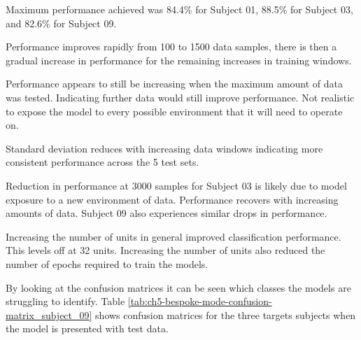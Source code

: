 Maximum performance achieved was 84.4\% for Subject 01, 88.5\% for Subject 03, and 82.6\% for Subject 09.

Performance improves rapidly from 100 to 1500 data samples, there is then a gradual increase in performance for the remaining increases in training windows.

Performance appears to still be increasing when the maximum amount of data was tested. Indicating further data would still improve performance. Not realistic to expose the model to every possible environment that it will need to operate on.

Standard deviation reduces with increasing data windows indicating more consistent performance across the 5 test sets.

Reduction in performance at 3000 samples for Subject 03 is likely due to model exposure to a new environment of data. Performance recovers with increasing amounts of data. Subject 09 also experiences similar drops in performance.

Increasing the number of units in general improved classification performance. This levels off at 32 units. Increasing the number of units also reduced the number of epochs required to train the models.

By looking at the confusion matrices it can be seen which classes the models are struggling to identify. Table \ref{tab:ch5-bespoke-mode-confusion-matrix_subject_09} shows confusion matrices for the three targets subjects when the model is presented with test data.

